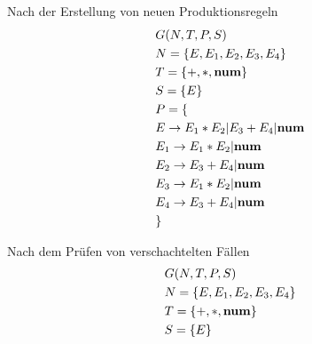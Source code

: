 \documentclass[t]{beamer}
\begin{document}
    \begin{frame}
        \centering
        \begin{minipage}[c]{0.4\textwidth}
            \vspace{-2em}
            \begin{block}{Nach der Erstellung von neuen Produktionsregeln}
                \vspace{-2em}
                \begin{align*}
                    & G(N,T,P,S) \\
                    & N= \{E, E_1, E_2, E_3, E_4\} \\
                    & T= \{+, *, \bold{num}\} \\
                    & S= \{E\} \\
                    & P = \{ \\
                    & E     \rightarrow E_1 * E_2 | E_3 + E_4 | \bold{num} \\
                    & E_1   \rightarrow E_1 * E_2 | \bold{num} \\
                    & E_2   \rightarrow E_3 + E_4 | \bold{num} \\
                    & E_3   \rightarrow E_1 * E_2 | \bold{num} \\
                    & E_4   \rightarrow E_3 + E_4 | \bold{num} \\
                    & \}
                \end{align*}
            \end{block}
        \end{minipage}%
        \quad%
        \quad%
        \begin{minipage}[c]{0.4\textwidth}
            \vspace{-1em}
            \begin{block}{Nach dem Prüfen von verschachtelten Fällen}
                \vspace{-2em}
                \begin{align*}
                    & G(N,T,P,S) \\
                    & N= \{E, E_1, E_2, E_3, E_4\} \\
                    & T= \{+, *, \bold{num}\} \\
                    & S= \{E\} \\

\end{align*}
\end{block}
\end{minipage}
\end{frame}
\end{document}
